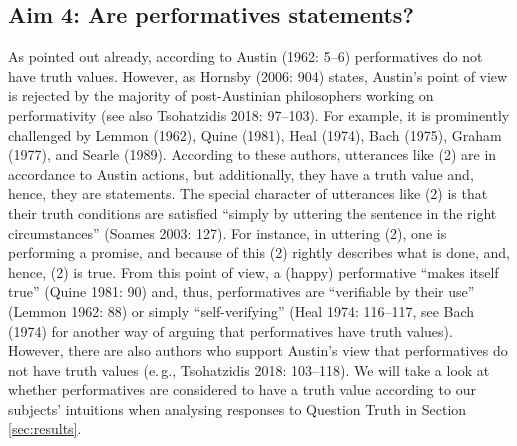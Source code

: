 \documentclass[egregdoesnotlikesansseriftitles,12pt]{scrartcl}
\begin{document}
\subsection{Aim 4: Are performatives statements?}
As pointed out already, according to Austin (1962: 5--6) performatives do not have truth values. However, as Hornsby (2006: 904) states, Austin's point of view is rejected by the majority of post-Austinian philosophers working on performativity (see also Tsohatzidis 2018: 97--103). For example, it is prominently challenged by Lemmon (1962), Quine (1981), Heal (1974), Bach (1975), Graham (1977), and Searle (1989). According to these authors, utterances like (2) are in accordance to Austin actions, but additionally, they have a truth value and, hence, they are statements. The special character of utterances like (2) is that their truth conditions are satisfied ``simply by uttering the sentence in the right circumstances'' (Soames 2003: 127). For instance, in uttering (2), one is performing a promise, and because of this (2) rightly describes what is done, and, hence, (2) is true. From this point of view, a (happy) performative ``makes itself true'' (Quine 1981: 90) and, thus, performatives are ``verifiable by their use'' (Lemmon 1962: 88) or simply ``self-verifying'' (Heal 1974: 116--117, see Bach (1974) for another way of arguing that performatives have truth values). However, there are also authors who support Austin's view that performatives do not have truth values (e.\,g., Tsohatzidis 2018: 103--118). We will take a look at whether performatives are considered to have a truth value according to our subjects' intuitions when analysing responses to Question Truth in Section \ref{sec:results}.


\end{document}
